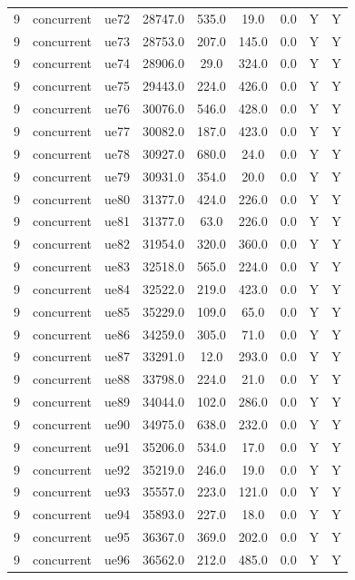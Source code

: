 \begin{table}[ht]
\begin{tabular}{|c|c|c|c|c|c|c|c|c|}
9 & concurrent & ue72 & 28747.0 & 535.0 & 19.0 & 0.0 & Y & Y \\
9 & concurrent & ue73 & 28753.0 & 207.0 & 145.0 & 0.0 & Y & Y \\
9 & concurrent & ue74 & 28906.0 & 29.0 & 324.0 & 0.0 & Y & Y \\
9 & concurrent & ue75 & 29443.0 & 224.0 & 426.0 & 0.0 & Y & Y \\
9 & concurrent & ue76 & 30076.0 & 546.0 & 428.0 & 0.0 & Y & Y \\
9 & concurrent & ue77 & 30082.0 & 187.0 & 423.0 & 0.0 & Y & Y \\
9 & concurrent & ue78 & 30927.0 & 680.0 & 24.0 & 0.0 & Y & Y \\
9 & concurrent & ue79 & 30931.0 & 354.0 & 20.0 & 0.0 & Y & Y \\
9 & concurrent & ue80 & 31377.0 & 424.0 & 226.0 & 0.0 & Y & Y \\
9 & concurrent & ue81 & 31377.0 & 63.0 & 226.0 & 0.0 & Y & Y \\
9 & concurrent & ue82 & 31954.0 & 320.0 & 360.0 & 0.0 & Y & Y \\
9 & concurrent & ue83 & 32518.0 & 565.0 & 224.0 & 0.0 & Y & Y \\
9 & concurrent & ue84 & 32522.0 & 219.0 & 423.0 & 0.0 & Y & Y \\
9 & concurrent & ue85 & 35229.0 & 109.0 & 65.0 & 0.0 & Y & Y \\
9 & concurrent & ue86 & 34259.0 & 305.0 & 71.0 & 0.0 & Y & Y \\
9 & concurrent & ue87 & 33291.0 & 12.0 & 293.0 & 0.0 & Y & Y \\
9 & concurrent & ue88 & 33798.0 & 224.0 & 21.0 & 0.0 & Y & Y \\
9 & concurrent & ue89 & 34044.0 & 102.0 & 286.0 & 0.0 & Y & Y \\
9 & concurrent & ue90 & 34975.0 & 638.0 & 232.0 & 0.0 & Y & Y \\
9 & concurrent & ue91 & 35206.0 & 534.0 & 17.0 & 0.0 & Y & Y \\
9 & concurrent & ue92 & 35219.0 & 246.0 & 19.0 & 0.0 & Y & Y \\
9 & concurrent & ue93 & 35557.0 & 223.0 & 121.0 & 0.0 & Y & Y \\
9 & concurrent & ue94 & 35893.0 & 227.0 & 18.0 & 0.0 & Y & Y \\
9 & concurrent & ue95 & 36367.0 & 369.0 & 202.0 & 0.0 & Y & Y \\
9 & concurrent & ue96 & 36562.0 & 212.0 & 485.0 & 0.0 & Y & Y \\

\end{tabular}
\end{table}
